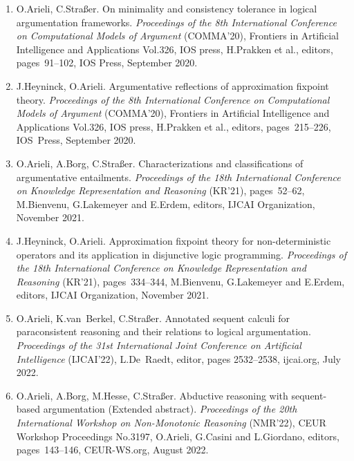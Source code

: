 \documentclass{article}
\begin{document}
\begin{enumerate}
  \item O.Arieli, C.Stra{\ss}er.
           On minimality and consistency tolerance in logical argumentation frameworks.
           {\em Proceedings of the 8th International Conference on Computational Models of Argument\/} (COMMA'20),
           Frontiers in Artificial Intelligence and Applications Vol.326, IOS press, H.Prakken et al., editors,
           pages~91--102, IOS Press, September 2020.

  \item J.Heyninck, O.Arieli.
           Argumentative reflections of approximation fixpoint theory.
           {\em Proceedings of the 8th International Conference on Computational Models of Argument\/} (COMMA'20),
           Frontiers in Artificial Intelligence and Applications Vol.326, IOS press, H.Prakken et al., editors,
           pages~215--226, IOS~Press, September 2020.

  \item O.Arieli, A.Borg, C.Stra{\ss}er.
          Characterizations and classifications of argumentative entailments.
          {\em Proceedings of the 18th International Conference on Knowledge Representation and Reasoning\/} (KR'21),
          pages~52--62, M.Bienvenu, G.Lakemeyer and E.Erdem, editors, IJCAI Organization, November 2021.

  \item J.Heyninck, O.Arieli.
          Approximation fixpoint theory for non-deterministic operators and its application in disjunctive logic programming.
          {\em Proceedings of the 18th International Conference on Knowledge Representation and Reasoning\/} (KR'21),
          pages~334--344, M.Bienvenu, G.Lakemeyer and E.Erdem, editors, IJCAI Organization, November 2021.

  \item O.Arieli, K.van~Berkel, C.Stra{\ss}er.
         Annotated sequent calculi for paraconsistent reasoning and their relations to logical argumentation.
         {\em Proceedings of the 31st International Joint Conference on Artificial Intelligence\/} (IJCAI'22),
         L.De~Raedt, editor, pages 2532--2538, ijcai.org, July 2022.

  \item O.Arieli, A.Borg, M.Hesse, C.Stra{\ss}er.
         Abductive reasoning with sequent-based argumentation (Extended abstract).
         {\em Proceedings of the 20th International Workshop on Non-Monotonic Reasoning\/} (NMR'22),
         CEUR Workshop Proceedings No.3197, O.Arieli, G.Casini and L.Giordano, editors, pages~143--146, CEUR-WS.org, August 2022.


\end{enumerate}
\end{document}
